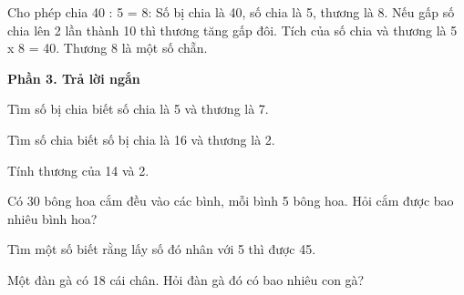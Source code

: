 \begin{ex} %
Cho phép chia 40 : 5 = 8:
\choiceTF
{\True Số bị chia là 40, số chia là 5, thương là 8.}
{Nếu gấp số chia lên 2 lần thành 10 thì thương tăng gấp đôi.}
{\True Tích của số chia và thương là 5 x 8 = 40.}
{\True Thương 8 là một số chẵn.}
\end{ex}

\textbf{Phần 3. Trả lời ngắn}

\begin{ex} %
Tìm số bị chia biết số chia là 5 và thương là 7.
\end{ex}

\begin{ex} %
Tìm số chia biết số bị chia là 16 và thương là 2.
\end{ex}

\begin{ex} %
Tính thương của 14 và 2.
\end{ex}

\begin{ex} %
Có 30 bông hoa cắm đều vào các bình, mỗi bình 5 bông hoa. Hỏi cắm được bao nhiêu bình hoa?
\end{ex}

\begin{ex} %
Tìm một số biết rằng lấy số đó nhân với 5 thì được 45.
\end{ex}

\begin{ex} %
Một đàn gà có 18 cái chân. Hỏi đàn gà đó có bao nhiêu con gà?
\end{ex}
